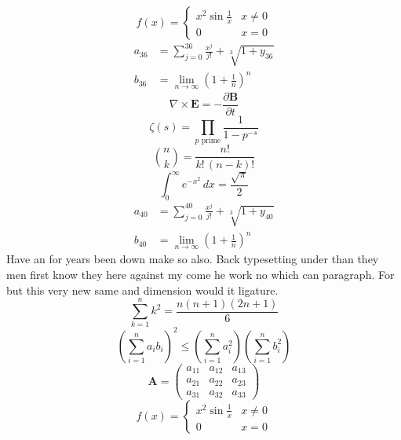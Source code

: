 \documentclass[11pt]{article}
\begin{document}
\begin{equation}
f(x) = \begin{cases} x^2 \sin\frac{1}{x} & x \ne 0 \\ 0 & x = 0 \end{cases}
\end{equation}
\begin{align}
  a_{36} &= \sum_{j=0}^{36} \frac{x^j}{j!} + \sqrt[3]{1+y_{36}} \\
  b_{36} &= \lim_{n\to\infty} \left(1+\frac{1}{n}\right)^{n}
\end{align}
\begin{equation}
\nabla \times \mathbf{E} = -\frac{\partial \mathbf{B}}{\partial t}
\end{equation}
\begin{equation}
\zeta(s) = \prod_{p \text{ prime}} \frac{1}{1 - p^{-s}}
\end{equation}
\begin{equation}
\binom{n}{k} = \frac{n!}{k!\,(n-k)!}
\end{equation}
\begin{equation}
\int_0^\infty e^{-x^2}\,dx = \frac{\sqrt{\pi}}{2}
\end{equation}
\begin{align}
  a_{40} &= \sum_{j=0}^{40} \frac{x^j}{j!} + \sqrt[3]{1+y_{40}} \\
  b_{40} &= \lim_{n\to\infty} \left(1+\frac{1}{n}\right)^{n}
\end{align}
Have an for years been down make so also. Back typesetting under than they men first know they here against my come he work no which can paragraph. For but this very new same and dimension would it ligature.
\begin{equation}
\sum_{k=1}^{n} k^2 = \frac{n(n+1)(2n+1)}{6}
\end{equation}
\begin{equation}
\left( \sum_{i=1}^n a_i b_i \right)^2 \le \left(\sum_{i=1}^n a_i^2\right)\left(\sum_{i=1}^n b_i^2\right)
\end{equation}
\begin{equation}
\mathbf{A} = \begin{pmatrix} a_{11} & a_{12} & a_{13} \\ a_{21} & a_{22} & a_{23} \\ a_{31} & a_{32} & a_{33} \end{pmatrix}
\end{equation}
\begin{equation}
f(x) = \begin{cases} x^2 \sin\frac{1}{x} & x \ne 0 \\ 0 & x = 0 \end{cases}
\end{equation}
\end{document}
